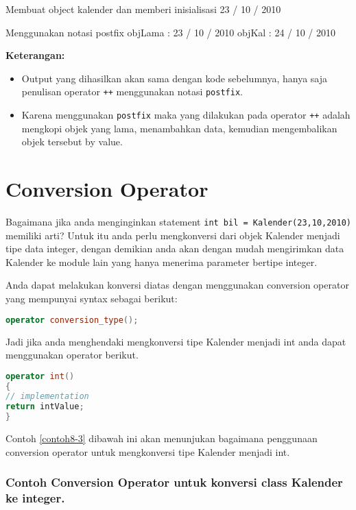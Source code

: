 \begin{lcverbatim}
Membuat object kalender dan memberi inisialisasi
23 / 10 / 2010

Menggunakan notasi postfix
objLama : 23 / 10 / 2010
objKal : 24 / 10 / 2010
\end{lcverbatim}

\textbf{Keterangan:}

\begin{itemize}

\item
  Output yang dihasilkan akan sama dengan kode sebelumnya, hanya saja
  penulisan operator \texttt{++} menggunakan notasi \texttt{postfix}.
\item
  Karena menggunakan \texttt{postfix} maka yang dilakukan pada operator
  \texttt{++} adalah mengkopi objek yang lama, menambahkan data,
  kemudian mengembalikan objek tersebut by value.
\end{itemize}

\section{Conversion Operator}\label{conversion-operator}

Bagaimana jika anda menginginkan statement
\texttt{int\ bil\ =\ Kalender(23,10,2010)} memiliki arti? Untuk itu anda
perlu mengkonversi dari objek Kalender menjadi tipe data integer, dengan
demikian anda akan dengan mudah mengirimkan data Kalender ke module lain
yang hanya menerima parameter bertipe integer.

Anda dapat melakukan konversi diatas dengan menggunakan conversion
operator yang mempunyai syntax sebagai berikut:

\begin{lstlisting}[language=c++, numbers=none]
operator conversion_type();
\end{lstlisting}

Jadi jika anda menghendaki mengkonversi tipe Kalender menjadi int anda
dapat menggunakan operator berikut.

\begin{lstlisting}[language=c++, numbers=none]
operator int()
{
// implementation
return intValue;
}
\end{lstlisting}

Contoh \ref{contoh8-3} dibawah ini akan menunjukan bagaimana penggunaan conversion
operator untuk mengkonversi tipe Kalender menjadi int.

\subsubsection*{Contoh Conversion Operator untuk konversi class Kalender ke integer.}

